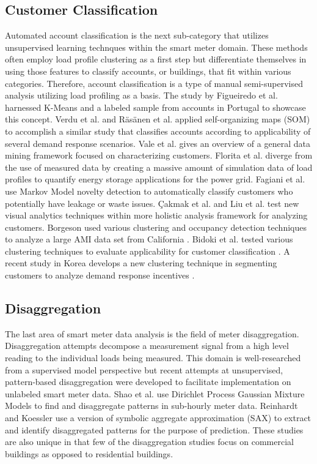 \subsection{Customer Classification}
Automated account classification is the next sub-category that utilizes unsupervised learning technques within the smart meter domain. These methods often employ load profile clustering as a first step but differentiate themselves in using those features to classify accounts, or buildings, that fit within various categories. Therefore, account classification is a type of manual semi-supervised analysis utilizing load profiling as a basis. The study by Figueiredo et al. \cite{figueiredo_electric_2005} harnessed K-Means and a labeled sample from accounts in Portugal to showcase this concept. Verdu et al. \cite{verdu_classification_2006} and R\"as\"anen et al. \cite{rasanen_reducing_2008} applied self-organizing maps (SOM) to accomplish a similar study that classifies accounts according to applicability of several demand response scenarios. Vale et al. \cite{vale_data_2009} gives an overview of a general data mining framework focused on characterizing customers. Florita et al. \cite{florita_classification_2012} diverge from the use of measured data by creating a massive amount of simulation data of load profiles to quantify energy storage applications for the power grid. Fagiani et al. \cite{fagiani_novelty_2015} use Markov Model novelty detection to automatically classify customers who potentially have leakage or waste issues. \c Cakmak et al. \cite{cakmak_new_2014} and Liu et al. \cite{liu_smas:_2015} test new visual analytics techniques within more holistic analysis framework for analyzing customers. Borgeson used various clustering and occupancy detection techniques to analyze a large AMI data set from California \cite{borgeson_targeted_2013}. Bidoki et al. tested various clustering techniques to evaluate applicability for customer classification \cite{bidoki_evaluating_2010}. A recent study in Korea develops a new clustering technique in segmenting customers to analyze demand response incentives \cite{jang_variability_2016}.

\subsection{Disaggregation}
The last area of smart meter data analysis is the field of meter disaggregation. Disaggregation attempts decompose a measurement signal from a high level reading to the individual loads being measured. This domain is well-researched from a supervised model perspective but recent attempts at unsupervised, pattern-based disaggregation were developed to facilitate implementation on unlabeled smart meter data. Shao et al. \cite{shao_temporal_2013} use Dirichlet Process Gaussian Mixture Models to find and disaggregate patterns in sub-hourly meter data. Reinhardt and Koessler \cite{reinhardt_powersax:_2014} use a version of symbolic aggregate approximation (SAX) to extract and identify disaggregated patterns for the purpose of prediction. These studies are also unique in that few of the disaggregation studies focus on commercial buildings as opposed to residential buildings.


